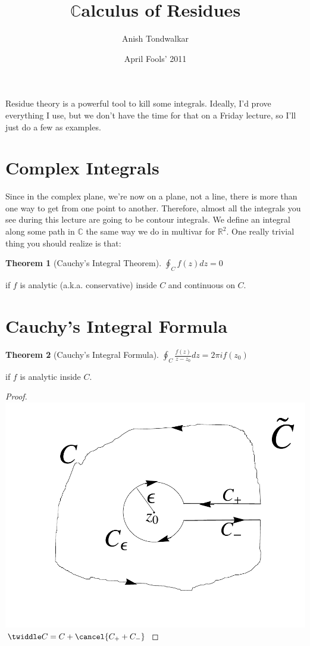 \documentclass[11pt,notitlepage]{article}
\title{$\mathbb{C}$alculus of Residues}
\author{Anish Tondwalkar}
\date{April Fools' 2011}
\newtheorem{thm}{Theorem}[section]
\begin{document}
\maketitle
Residue theory is a powerful tool to kill some integrals. Ideally, I'd prove everything I use, but we don't have the time for that on a Friday lecture, so I'll just do a few as examples. 
\section{Complex Integrals}
Since in the complex plane, we're now on a plane, not a line, there is more than one way to get from one point to another. Therefore, almost all the integrals you see during this lecture are going to be contour integrals. We define an integral along some path in $\mathbb{C}$ the same way we do in multivar for $\mathbb{R}^2$. One really trivial thing you should realize is that:
\begin{thm}[Cauchy's Integral Theorem]
$\oint_C f(z) dz = 0$ 
\end{thm}
\begin{flushright}
if $f$ is analytic (a.k.a.\! conservative) inside $C$ and continuous on $C$.
\end{flushright}
\section{Cauchy's Integral Formula}
\begin{thm}[Cauchy's Integral Formula]
$\oint_C \frac{f(z)}{z-z_0} dz = 2 \pi i f(z_0)$ 
\end{thm}
\begin{flushright}
if $f$ is analytic inside $C$.
\end{flushright}
\begin{proof}
\includegraphics{ctwiddle}
$\twiddle C = C + \cancel{C_{+} + C_{-}}$

\end{proof}
\end{document}
